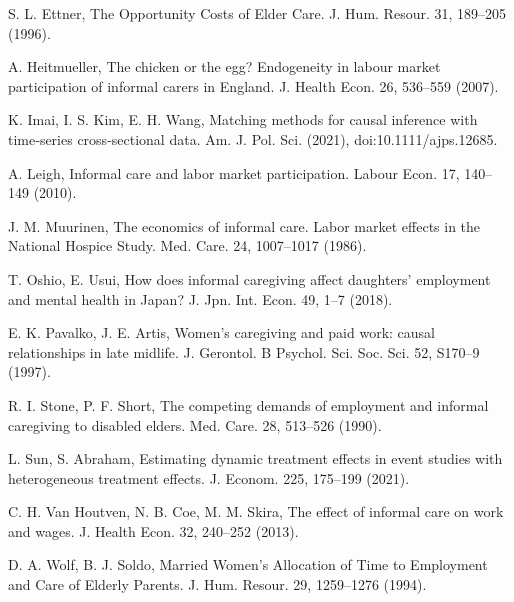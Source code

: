 \documentclass{article}
\theoremstyle{definition}
\begin{document}
\begin{thebibliography}{99}
    \item S. L. Ettner, The Opportunity Costs of Elder Care. J. Hum. Resour. 31, 189–205 (1996).
    
    \item A. Heitmueller, The chicken or the egg? Endogeneity in labour market participation of informal carers in England. J. Health Econ. 26, 536–559 (2007).
    
    \item K. Imai, I. S. Kim, E. H. Wang, Matching methods for causal inference with time‐series cross‐sectional data. Am. J. Pol. Sci. (2021), doi:10.1111/ajps.12685.
    
    \item A. Leigh, Informal care and labor market participation. Labour Econ. 17, 140–149 (2010).
    
    \item J. M. Muurinen, The economics of informal care. Labor market effects in the National Hospice Study. Med. Care. 24, 1007–1017 (1986).
    
    \item T. Oshio, E. Usui, How does informal caregiving affect daughters’ employment and mental health in Japan? J. Jpn. Int. Econ. 49, 1–7 (2018).
    
    \item E. K. Pavalko, J. E. Artis, Women’s caregiving and paid work: causal relationships in late midlife. J. Gerontol. B Psychol. Sci. Soc. Sci. 52, S170–9 (1997).
    
    \item R. I. Stone, P. F. Short, The competing demands of employment and informal caregiving to disabled elders. Med. Care. 28, 513–526 (1990).
    
    \item L. Sun, S. Abraham, Estimating dynamic treatment effects in event studies with heterogeneous treatment effects. J. Econom. 225, 175–199 (2021).
    
    \item C. H. Van Houtven, N. B. Coe, M. M. Skira, The effect of informal care on work and wages. J. Health Econ. 32, 240–252 (2013).
    
    \item D. A. Wolf, B. J. Soldo, Married Women’s Allocation of Time to Employment and Care of Elderly Parents. J. Hum. Resour. 29, 1259–1276 (1994).
\end{thebibliography}
\end{document}
